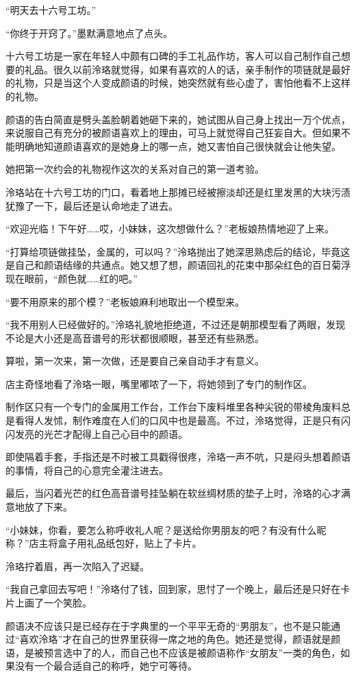 \documentclass[UTF8, scheme = chinese, openany]{ctexbook}
\begin{document}
“明天去十六号工坊。”

“你终于开窍了。”墨默满意地点了点头。

十六号工坊是一家在年轻人中颇有口碑的手工礼品作坊，客人可以自己制作自己想要的礼品。很久以前泠珞就觉得，如果有喜欢的人的话，亲手制作的项链就是最好的礼物，只是当这个人变成颜语的时候，她突然就有些心虚了，害怕他看不上这样的礼物。

颜语的告白简直是劈头盖脸朝着她砸下来的，她试图从自己身上找出一万个优点，来说服自己有充分的被颜语喜欢上的理由，可马上就觉得自己狂妄自大。但如果不能明确地知道颜语喜欢的是她身上的哪一点，她又害怕自己很快就会让他失望。

她把第一次约会的礼物视作这次的关系对自己的第一道考验。

泠珞站在十六号工坊的门口，看着地上那摊已经被擦淡却还是红里发黑的大块污渍犹豫了一下，最后还是认命地走了进去。

“欢迎光临！下午好……哎，小妹妹，这次想做什么？”老板娘热情地迎了上来。

“打算给项链做挂坠，金属的，可以吗？”泠珞抛出了她深思熟虑后的结论，毕竟这是自己和颜语结缘的共通点。她又想了想，颜语回礼的花束中那朵红色的百日菊浮现在眼前，“颜色就……红的吧。”

“要不用原来的那个模？”老板娘麻利地取出一个模型来。

“我不用别人已经做好的。”泠珞礼貌地拒绝道，不过还是朝那模型看了两眼，发现不论是大小还是高音谱号的形状都很顺眼，甚至还有些熟悉。

算啦，第一次来，第一次做，还是要自己亲自动手才有意义。

店主奇怪地看了泠珞一眼，嘴里嘟哝了一下，将她领到了专门的制作区。

制作区只有一个专门的金属用工作台，工作台下废料堆里各种尖锐的带棱角废料总是看得人发怵，制作难度在人们的口风中也是最高。不过，泠珞觉得，正是只有闪闪发亮的光芒才配得上自己心目中的颜语。

即使隔着手套，手指还是不时被工具戳得很疼，泠珞一声不吭，只是闷头想着颜语的事情，将自己的心意完全灌注进去。

最后，当闪着光芒的红色高音谱号挂坠躺在软丝绸材质的垫子上时，泠珞的心才满意地放了下来。

“小妹妹，你看，要怎么称呼收礼人呢？是送给你男朋友的吧？有没有什么昵称？”店主将盒子用礼品纸包好，贴上了卡片。

泠珞拧着眉，再一次陷入了迟疑。

“我自己拿回去写吧！”泠珞付了钱，回到家，思忖了一个晚上，最后还是只好在卡片上画了一个笑脸。

颜语决不应该只是已经存在于字典里的一个平平无奇的“男朋友”，也不是只能通过“喜欢泠珞”才在自己的世界里获得一席之地的角色。她还是觉得，颜语就是颜语，是被预言选中了的人，而自己也不应该是被颜语称作“女朋友”一类的角色，如果没有一个最合适自己的称呼，她宁可等待。
\end{document}

